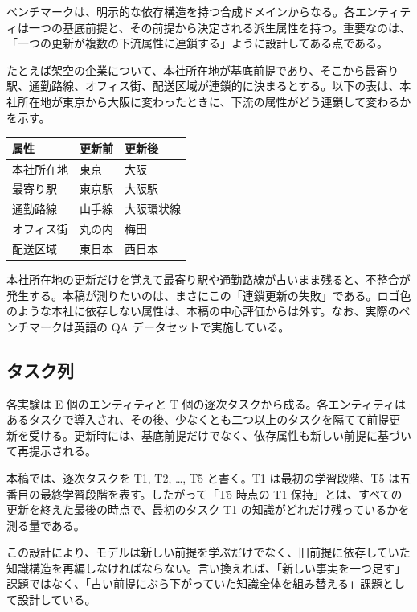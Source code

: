 \documentclass[12pt,a4paper]{article}
\begin{document}
ベンチマークは、明示的な依存構造を持つ合成ドメインからなる。各エンティティは一つの基底前提と、その前提から決定される派生属性を持つ。重要なのは、「一つの更新が複数の下流属性に連鎖する」ように設計してある点である。

たとえば架空の企業について、本社所在地が基底前提であり、そこから最寄り駅、通勤路線、オフィス街、配送区域が連鎖的に決まるとする。以下の表は、本社所在地が東京から大阪に変わったときに、下流の属性がどう連鎖して変わるかを示す。

{\def\LTcaptype{table} %
\begin{longtable}[]{@{}lll@{}}
\toprule\noalign{}
属性 & 更新前 & 更新後 \\
\midrule\noalign{}
\endhead
\bottomrule\noalign{}
\endlastfoot
本社所在地 & 東京 & 大阪 \\
最寄り駅 & 東京駅 & 大阪駅 \\
通勤路線 & 山手線 & 大阪環状線 \\
オフィス街 & 丸の内 & 梅田 \\
配送区域 & 東日本 & 西日本 \\
\end{longtable}
}

本社所在地の更新だけを覚えて最寄り駅や通勤路線が古いまま残ると、不整合が発生する。本稿が測りたいのは、まさにこの「連鎖更新の失敗」である。ロゴ色のような本社に依存しない属性は、本稿の中心評価からは外す。なお、実際のベンチマークは英語の QA データセットで実施している。

\subsection{タスク列}\label{ux30bfux30b9ux30afux5217}

各実験は E 個のエンティティと T 個の逐次タスクから成る。各エンティティはあるタスクで導入され、その後、少なくとも二つ以上のタスクを隔てて前提更新を受ける。更新時には、基底前提だけでなく、依存属性も新しい前提に基づいて再提示される。

本稿では、逐次タスクを T1, T2, \ldots, T5 と書く。T1 は最初の学習段階、T5 は五番目の最終学習段階を表す。したがって「T5 時点の T1 保持」とは、すべての更新を終えた最後の時点で、最初のタスク T1 の知識がどれだけ残っているかを測る量である。

この設計により、モデルは新しい前提を学ぶだけでなく、旧前提に依存していた知識構造を再編しなければならない。言い換えれば、「新しい事実を一つ足す」課題ではなく、「古い前提にぶら下がっていた知識全体を組み替える」課題として設計している。
\end{document}
